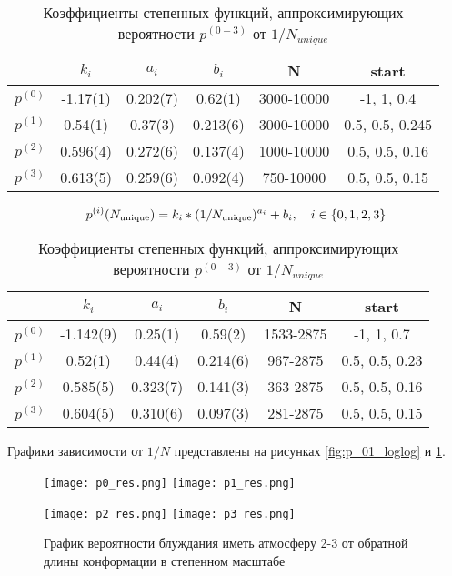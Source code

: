 \begin{table}[h] 
\centering
\begin{tabular}{|c|c|c|c|c|c|}
\hline
 & $k_i$ & $a_i$ & $b_i$ & N & start  \\ \hline
$p^{(0)}$ & -1.17(1) & 0.202(7) & 0.62(1) & 3000-10000 & -1, 1, 0.4 \\ \hline 
$p^{(1)}$ & 0.54(1) & 0.37(3) & 0.213(6) & 3000-10000 & 0.5, 0.5, 0.245 \\ \hline
$p^{(2)}$ & 0.596(4) & 0.272(6) & 0.137(4) & 1000-10000 & 0.5, 0.5, 0.16 \\ \hline
$p^{(3)}$ & 0.613(5) & 0.259(6) & 0.092(4) & 750-10000 & 0.5, 0.5, 0.15 \\ \hline
\end{tabular}
\caption{Коэффициенты степенных функций, аппроксимирующих вероятности $p^{(0-3)}$ от $1/N$, описанных на графиках \ref{fig:p_01_loglog} и \ref{fig:p_23_loglog}}
\label{tab:p_i_log_log}

\begin{equation}
p^{(i)}(N_{\textup{unique}}) = k_i * (1/N_{\textup{unique}})^{a_i} + b_i, \ \ \ i \in \{ 0,1,2,3\}
\end{equation}

\begin{tabular}{|c|c|c|c|c|c|} \hline
 & $k_i$ & $a_i$ & $b_i$ & N & start  \\ \hline
$p^{(0)}$ & -1.142(9) & 0.25(1) & 0.59(2) & 1533-2875 &  -1, 1, 0.7 \\ \hline
$p^{(1)}$ & 0.52(1) & 0.44(4) & 0.214(6) & 967-2875 & 0.5, 0.5, 0.23\\ \hline
$p^{(2)}$ & 0.585(5) & 0.323(7) & 0.141(3) & 363-2875  & 0.5, 0.5, 0.16\\ \hline
$p^{(3)}$ & 0.604(5) & 0.310(6) & 0.097(3) & 281-2875 & 0.5, 0.5, 0.15\\ \hline
\end{tabular}

\caption{Коэффициенты степенных функций, аппроксимирующих вероятности $p^{(0-3)}$ от $1/N_{unique}$}
\label{tab:p_iu_log_log}
\end{table}

Графики зависимости от $1/N$ представлены на рисунках \ref{fig:p_01_loglog} и \ref{fig:p_23_loglog}.

\begin{figure}[h]
\centering
\begin{minipage}{0.49\textwidth}
\texttt{[image: p0\_res.png]}
\texttt{[image: p1\_res.png]}
\caption{График вероятности блуждания иметь атмосферу 0-1 от обратной длины конформации в степенном масштабе}
\label{fig:p_01_loglog}
\end{minipage}
\hfill
\begin{minipage}{0.49\textwidth}
\centering
\texttt{[image: p2\_res.png]}
\texttt{[image: p3\_res.png]}
\caption{График вероятности блуждания иметь атмосферу 2-3 от обратной длины конформации в степенном масштабе}
\label{fig:p_23_loglog}
\end{minipage}
\end{figure}


